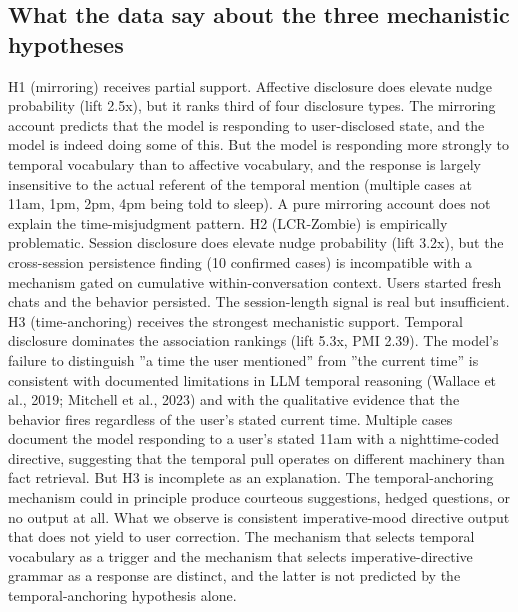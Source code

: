 \documentclass{obelus-preprint}
\begin{document}
\subsection{What the data say about the three mechanistic hypotheses}
H1 (mirroring) receives partial support. Affective disclosure does elevate nudge probability (lift 2.5x), but it ranks third of four disclosure types. The mirroring account predicts that the model is responding to user-disclosed state, and the model is indeed doing some of this. But the model is responding more strongly to temporal vocabulary than to affective vocabulary, and the response is largely insensitive to the actual referent of the temporal mention (multiple cases at 11am, 1pm, 2pm, 4pm being told to sleep). A pure mirroring account does not explain the time-misjudgment pattern.
H2 (LCR-Zombie) is empirically problematic. Session disclosure does elevate nudge probability (lift 3.2x), but the cross-session persistence finding (10 confirmed cases) is incompatible with a mechanism gated on cumulative within-conversation context. Users started fresh chats and the behavior persisted. The session-length signal is real but insufficient.
H3 (time-anchoring) receives the strongest mechanistic support. Temporal disclosure dominates the association rankings (lift 5.3x, PMI 2.39). The model's failure to distinguish ''a time the user mentioned'' from ''the current time'' is consistent with documented limitations in LLM temporal reasoning (Wallace et al., 2019; Mitchell et al., 2023) and with the qualitative evidence that the behavior fires regardless of the user's stated current time. Multiple cases document the model responding to a user's stated 11am with a nighttime-coded directive, suggesting that the temporal pull operates on different machinery than fact retrieval.
But H3 is incomplete as an explanation. The temporal-anchoring mechanism could in principle produce courteous suggestions, hedged questions, or no output at all. What we observe is consistent imperative-mood directive output that does not yield to user correction. The mechanism that selects temporal vocabulary as a trigger and the mechanism that selects imperative-directive grammar as a response are distinct, and the latter is not predicted by the temporal-anchoring hypothesis alone.
\end{document}
